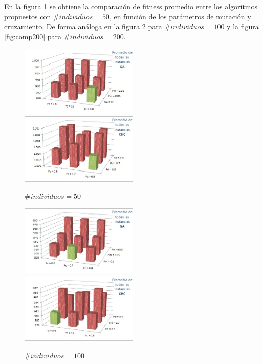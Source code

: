 \documentclass[journal]{IEEEtran}
\begin{document}
En la figura \ref{fig:comp50} se obtiene la comparación de fitness promedio entre los algoritmos propuestos con $\#individuos=50$, en función de los parámetros de mutación y cruzamiento. De forma análoga en la figura \ref{fig:comp100} para $\#individuos=100$ y la figura \ref{fig:comp200} para $\#individuos=200$.


\begin{figure}[]
  \centering
    \includegraphics[width=0.5\textwidth]{./figuras/Graficas/Comparacion/GA-50IND.jpg}
    \includegraphics[width=0.5\textwidth]{./figuras/Graficas/Comparacion/CHC-50IND.jpg}
  \caption{$\#individuos=50$}
  \label{fig:comp50}
\end{figure} 


\begin{figure}[]
  \centering
    \includegraphics[width=0.5\textwidth]{./figuras/Graficas/Comparacion/GA-100IND.jpg}
    \includegraphics[width=0.5\textwidth]{./figuras/Graficas/Comparacion/CHC-100IND.jpg}
  \caption{$\#individuos=100$}
  \label{fig:comp100}
\end{figure} 
\end{document}
